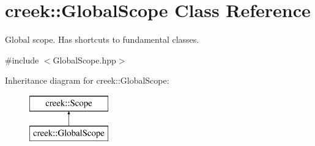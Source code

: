 \hypertarget{classcreek_1_1_global_scope}{}\section{creek\+:\+:Global\+Scope Class Reference}
\label{classcreek_1_1_global_scope}


Global scope. Has shortcuts to fundamental classes.  




{\ttfamily \#include $<$Global\+Scope.\+hpp$>$}

Inheritance diagram for creek\+:\+:Global\+Scope\+:\begin{figure}[H]
\begin{center}
\leavevmode
\includegraphics[height=2.000000cm]{classcreek_1_1_global_scope}
\end{center}
\end{figure}
